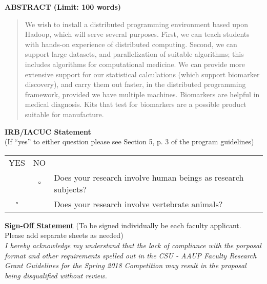 \documentclass[]{article}
\begin{document}
	
	
	


\begin{center}
	\textbf{ABSTRACT (Limit: 100 words)}
	\begin{abstract}
		We wish to install a distributed programming environment based upon Hadoop, which will serve several purposes. First, we can teach students with hands-on experience of distributed computing. Second, we can support large datasets, and parallelization of suitable algorithms; this includes algorithms for computational medicine. We can provide more extensive support for our statistical calculations (which support biomarker discovery), and carry them out faster, in the distributed programming framework, provided we have multiple machines. Biomarkers are helpful in medical diagnosis. Kits that test for biomarkers are a possible product suitable for manufacture. %
	\end{abstract}
\end{center}





\noindent \textbf{IRB/IACUC Statement}\\
(If ``yes'' to either question please see Section 5, p. 3 of the program guidelines)\\
\begin{tabular}{ccl}
	YES  &    NO & \\
	\Checkedbox & $\square$  &Does your research involve human beings as research subjects?\\
	$\square$  &\Checkedbox &Does your research involve vertebrate animals?\\
\end{tabular}



\underline{\textbf{Sign-Off Statement}} (To be signed individually be each faculty applicant. Please add separate sheets as needed)\\
\textit{I hereby acknowledge my understand that the lack of compliance with the porposal format and other requirements spelled out in the CSU - AAUP Faculty Research Grant Guidelines for the Spring 2018 Competition may result in the proposal being disqualified without review.}\\
\end{document}
